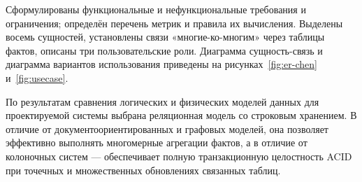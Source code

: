 Сформулированы функциональные и нефункциональные требования и ограничения;
определён перечень метрик и правила их вычисления. Выделены восемь сущностей,
установлены связи «многие-ко-многим» через таблицы фактов, описаны три
пользовательские роли. Диаграмма сущность-связь и диаграмма вариантов
использования приведены на рисунках~\ref{fig:er-chen} и~\ref{fig:usecase}.

По результатам сравнения логических и физических моделей данных для
проектируемой системы выбрана реляционная модель со строковым хранением.
В отличие от документоориентированных и графовых моделей, она позволяет
эффективно выполнять многомерные агрегации фактов, а в отличие от колоночных
систем --- обеспечивает полную транзакционную целостность ACID при точечных
и множественных обновлениях связанных таблиц.
